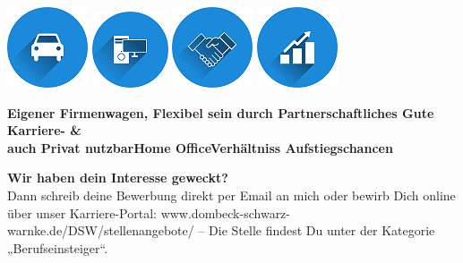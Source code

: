 \documentclass[12pt,utf8]{scrartcl}
\begin{document}
\begin{flushleft}
\begin{center}
	\includegraphics{images/auto}\label{fig:auto}\hspace{1,5cm}
	\includegraphics{images/home}\label{fig:home}\hspace{1,5cm}	
	\includegraphics{images/handshake}\label{fig:handshake}\hspace{1,5cm}		
	\includegraphics{images/statistics}\label{fig:statistics}  
\end{center}
\hspace{0,3cm}\textbf{Eigener Firmenwagen,\hspace{0,7cm} Flexibel sein durch \hspace{0,9cm}Partnerschaftliches \hspace{1,1cm}Gute Karriere- \& \\ \hspace{0,4cm}auch Privat nutzbar\hspace{1,5cm}Home Office\hspace{2,1cm}Verhältniss \hspace{2cm}Aufstiegschancen} 			

\vspace{1cm}
\textbf{Wir haben dein Interesse geweckt?}\\
Dann schreib deine Bewerbung direkt per Email an mich oder bewirb Dich online über unser Karriere-Portal: www.dombeck-schwarz-warnke.de/DSW/stellenangebote/ – Die Stelle findest Du unter der Kategorie „Berufseinsteiger“.

\normalsize
\newpage
{}



\end{flushleft}
\end{document}
